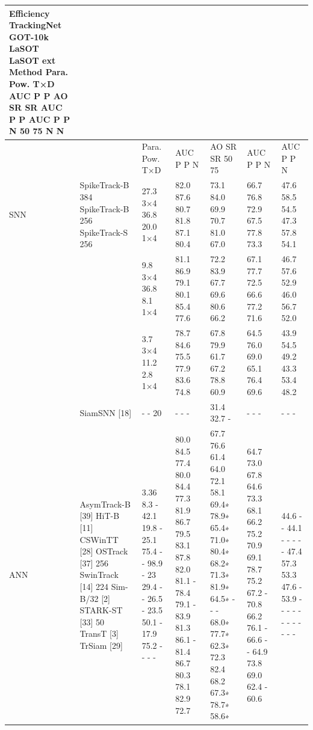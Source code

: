 \begin{tabular}{lllllll}
\toprule
Efficiency TrackingNet GOT-10k LaSOT LaSOT ext Method Para. Pow. T×D AUC P P AO SR SR AUC P P AUC P P N 50 75 N N &  &  &  &  &  &  \\
\midrule
 &  & Para. Pow. T×D & AUC P P N & AO SR SR 50 75 & AUC P P N & AUC P P N \\
SNN & SpikeTrack-B 384 SpikeTrack-B 256 SpikeTrack-S 256 & 27.3 3×4 36.8 20.0 1×4 & 82.0 87.6 80.7 81.8 87.1 80.4 & 73.1 84.0 69.9 70.7 81.0 67.0 & 66.7 76.8 72.9 67.5 77.8 73.3 & 47.6 58.5 54.5 47.3 57.8 54.1 \\
 &  & 9.8 3×4 36.8 8.1 1×4 & 81.1 86.9 79.1 80.1 85.4 77.6 & 72.2 83.9 67.7 69.6 80.6 66.2 & 67.1 77.7 72.5 66.6 77.2 71.6 & 46.7 57.6 52.9 46.0 56.7 52.0 \\
 &  & 3.7 3×4 11.2 2.8 1×4 & 78.7 84.6 75.5 77.9 83.6 74.8 & 67.8 79.9 61.7 67.2 78.8 60.9 & 64.5 76.0 69.0 65.1 76.4 69.6 & 43.9 54.5 49.2 43.3 53.4 48.2 \\
 & SiamSNN [18] & - - 20 & - - - & 31.4 32.7 - & - - - & - - - \\
ANN & AsymTrack-B [39] HiT-B [11] CSWinTT [28] OSTrack [37] 256 SwinTrack [14] 224 Sim-B/32 [2] STARK-ST [33] 50 TransT [3] TrSiam [29] & 3.36 8.3 - 42.1 19.8 - 25.1 75.4 - - 98.9 - 23 29.4 - - 26.5 - 23.5 50.1 - 17.9 75.2 - - - - & 80.0 84.5 77.4 80.0 84.4 77.3 81.9 86.7 79.5 83.1 87.8 82.0 81.1 - 78.4 79.1 - 83.9 81.3 86.1 - 81.4 86.7 80.3 78.1 82.9 72.7 & 67.7 76.6 61.4 64.0 72.1 58.1 69.4∗ 78.9∗ 65.4∗ 71.0∗ 80.4∗ 68.2∗ 71.3∗ 81.9∗ 64.5∗ - - - 68.0∗ 77.7∗ 62.3∗ 72.3 82.4 68.2 67.3∗ 78.7∗ 58.6∗ & 64.7 73.0 67.8 64.6 73.3 68.1 66.2 75.2 70.9 69.1 78.7 75.2 67.2 - 70.8 66.2 76.1 - 66.6 - - 64.9 73.8 69.0 62.4 - 60.6 & 44.6 - - 44.1 - - - - - 47.4 57.3 53.3 47.6 - 53.9 - - - - - - - - - - - - \\
\bottomrule
\end{tabular}
